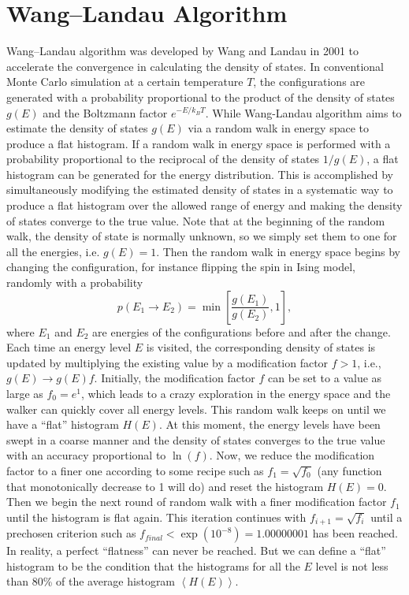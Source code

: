 \section{Wang--Landau Algorithm\label{Sec:ES:Wang--Landau}}
Wang--Landau algorithm was developed by Wang and Landau in 2001 to accelerate the convergence in calculating the density of states.\cite{WangPRL2001} In conventional Monte Carlo simulation at a certain temperature $T$, the configurations are generated with a probability proportional to the product of the density of states $g(E)$ and the Boltzmann factor $e^{-E/k_BT}$. While Wang-Landau algorithm aims to estimate the density of states $g(E)$ via a random walk in energy space to produce a flat histogram. If a random walk in energy space is performed with a probability proportional to the reciprocal of the density of states $1/g(E)$, a flat histogram can be generated for the energy distribution. This is accomplished by simultaneously modifying the estimated density of states in a systematic way to produce a flat histogram over the allowed range of energy and making the density of states converge to the true value. Note that at the beginning of the random walk, the density of state is normally unknown, so we simply set them to one for all the energies, i.e. $g(E)=1$. Then the random walk in energy space begins by changing the configuration, for instance flipping the spin in Ising model, randomly with a probability
\begin{equation}
    p(E_1\to E_2)=\min\left[\frac{g(E_1)}{g(E_2)},1\right],
\end{equation}
where $E_1$ and $E_2$ are energies of the configurations before and after the change. Each time an energy level $E$ is visited, the corresponding density of states is updated by multiplying the existing value by a modification factor $f>1$, i.e., $g(E)\to g(E)f$. Initially, the modification factor $f$ can be set to a value as large as $f_0=e^1$, which leads to a crazy exploration in the energy space and the walker can quickly cover all energy levels. This random walk keeps on until we have a ``flat'' histogram $H(E)$. At this moment, the energy levels have been swept in a coarse manner and the density of states converges to the true value with an accuracy proportional to $\ln{(f)}$. Now, we reduce the modification factor to a finer one according to some recipe such as $f_1=\sqrt{f_0}$ (any function that monotonically decrease to 1 will do) and reset the histogram $H(E)=0$. Then we begin the next round of random walk with a finer modification factor $f_1$ until the histogram is flat again. This iteration continues with $f_{i+1}=\sqrt{f_i}$ until a prechosen criterion such as $f_{final}<\exp(10^{-8})=1.00000001$ has been reached. In reality, a perfect ``flatness'' can never be reached. But we can define a ``flat'' histogram to be the condition that the histograms for all the $E$ level is not less than 80\% of the average histogram $\left<H(E)\right>$.

